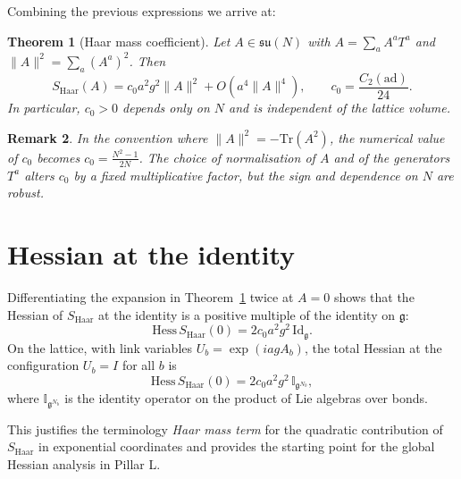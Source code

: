 \documentclass[11pt]{article}
\numberwithin{equation}{section}
\newtheorem{theorem}{Theorem}[section]
\newtheorem{remark}[theorem]{Remark}
\begin{document}
Combining the previous expressions we arrive at:

\begin{theorem}[Haar mass coefficient]
\label{thm:haar-mass-coeff-technical}
Let $A\in\mathfrak{su}(N)$ with $A=\sum_a A^a T^a$ and
$\|A\|^2 = \sum_a (A^a)^2$.  Then
\[
  S_{\mathrm{Haar}}(A)
  = c_0 a^2 g^2 \|A\|^2 + O(a^4\|A\|^4),\qquad
  c_0 = \frac{C_2(\mathrm{ad})}{24}.
\]
In particular, $c_0>0$ depends only on $N$ and is independent of the
lattice volume.
\end{theorem}

\begin{remark}
In the convention where $\|A\|^2 = -\mathrm{Tr}(A^2)$, the numerical
value of $c_0$ becomes $c_0 = \frac{N^2-1}{2N}$.  The choice of
normalisation of $A$ and of the generators $T^a$ alters $c_0$ by a fixed
multiplicative factor, but the sign and dependence on $N$ are robust.
\end{remark}

\section{Hessian at the identity}

Differentiating the expansion in Theorem~\ref{thm:haar-mass-coeff-technical}
twice at $A=0$ shows that the Hessian of $S_{\mathrm{Haar}}$ at the
identity is a positive multiple of the identity on $\mathfrak{g}$:
\[
  \mathrm{Hess}\,S_{\mathrm{Haar}}(0)
  = 2c_0 a^2 g^2\,\mathrm{Id}_{\mathfrak{g}}.
\]
On the lattice, with link variables $U_b=\exp(iagA_b)$, the total
Hessian at the configuration $U_b=I$ for all $b$ is
\[
  \mathrm{Hess}\,S_{\mathrm{Haar}}(0)
  = 2c_0 a^2 g^2\,\mathbb{I}_{\mathfrak{g}^{N_b}},
\]
where $\mathbb{I}_{\mathfrak{g}^{N_b}}$ is the identity operator on the
product of Lie algebras over bonds.

This justifies the terminology \emph{Haar mass term} for the quadratic
contribution of $S_{\mathrm{Haar}}$ in exponential coordinates and
provides the starting point for the global Hessian analysis in Pillar L.
\qedhere
\end{document}
